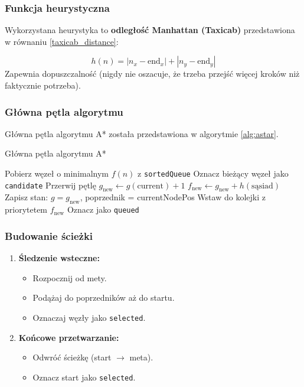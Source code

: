 \documentclass[../../../../doc.tex]{subfiles}
\begin{document}
\subsubsection{Funkcja heurystyczna}
Wykorzystana heurystyka to \textbf{odległość Manhattan (Taxicab)} przedstawiona w równaniu \ref{taxicab_distance}:

\begin{equation}
  h(n) = |n_x - \text{end}_x| + |n_y - \text{end}_y|
  \label{taxicab_distance}
\end{equation}
Zapewnia dopuszczalność (nigdy nie oszacuje, że trzeba przejść więcej kroków niż faktycznie potrzeba).

\subsubsection{Główna pętla algorytmu}

Główna pętla algorytmu A* została przedstawiona w algorytmie \ref{alg:astar}.

\begin{algorithm}
  \caption{Główna pętla algorytmu A*}
  \begin{algorithmic}
    \STATE Pobierz węzeł o minimalnym $f(n)$ z \texttt{sortedQueue}
    \STATE Oznacz bieżący węzeł jako \texttt{candidate}
    \STATE Przerwij pętlę
    \ENDIF
    \STATE $g_{\text{new}} \gets g(\text{current}) + 1$
    \STATE $f_{\text{new}} \gets g_{\text{new}} + h(\text{sąsiad})$
    \STATE Zapisz stan: $g = g_{\text{new}}$, poprzednik = currentNodePos
    \STATE Wstaw do kolejki z priorytetem $f_{\text{new}}$
    \STATE Oznacz jako \texttt{queued}
    \ENDIF
    \ENDFOR
    \ENDWHILE
  \end{algorithmic}
  \label{alg:astar}
\end{algorithm}

\subsubsection{Budowanie ścieżki}
\begin{enumerate}
  \item \textbf{Śledzenie wsteczne:}
        \begin{itemize}
          \item Rozpocznij od mety.
          \item Podążaj do poprzedników aż do startu.
          \item Oznaczaj węzły jako \texttt{selected}.
        \end{itemize}
  \item \textbf{Końcowe przetwarzanie:}
        \begin{itemize}
          \item Odwróć ścieżkę (start $\rightarrow$ meta).
          \item Oznacz start jako \texttt{selected}.
        \end{itemize}
\end{enumerate}
\end{document}
